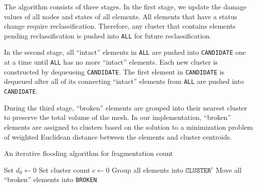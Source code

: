 The algorithm consists of three stages. In the first stage, we update the damage values of all nodes and states of all elements. All elements that have a status change require reclassification. Therefore, any cluster that contains elements pending reclassification is pushed into \texttt{ALL} for future reclassification.

In the second stage, all ``intact'' elements in \texttt{ALL} are pushed into \texttt{CANDIDATE} one at a time until \texttt{ALL} has no more ``intact'' elements. Each new cluster is constructed by dequeueing \texttt{CANDIDATE}. The first element in \texttt{CANDIDATE} is dequeued after all of its connecting ``intact'' elements from \texttt{ALL} are pushed into \texttt{CANDIDATE}.

During the third stage, ``broken'' elements are grouped into their nearest cluster to preserve the total volume of the mesh. In our implementation,  ``broken'' elements are assigned to clusters based on the solution to a minimization problem of weighted Euclidean distance between the elements and cluster centroids.

\begin{algorithm}[!htbp]
  \caption{An iterative flooding algorithm for fragmentation count}
  \begin{algorithmic}[1]
    \State Set $d_0 \leftarrow 0$
    \State Set cluster count $c \leftarrow 0$
    \State Group all elements into $\texttt{CLUSTER}^c$
    \State Move all ``broken'' elements into \texttt{BROKEN}
    \EndIf
    \EndFor
    \Else
    \Else
    \EndIf
    \EndFor
    \EndWhile
    \EndIf
    \EndWhile
    \EndFor
  \end{algorithmic}
  \label{alg: flooding}
\end{algorithm}

